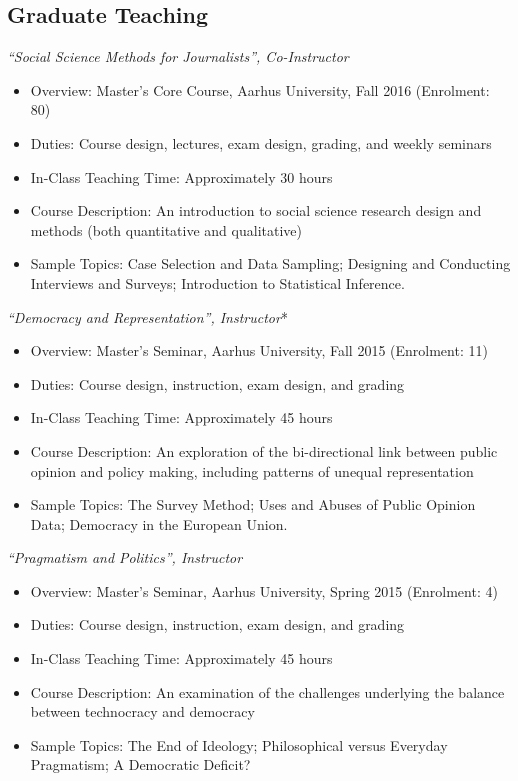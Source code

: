 \documentclass[11pt]{article}
\begin{document}
\subsection{Graduate Teaching}
\textit{“Social Science Methods for Journalists”, Co-Instructor}
	      \begin{itemize}[itemsep=0em, topsep=0em, partopsep=0em]
	      	\kern-\parskip\item Overview: Master’s Core Course, Aarhus University, Fall 2016 (Enrolment: 80)
	      	\item Duties: Course design, lectures, exam design, grading, and weekly seminars
	      	\item In-Class Teaching Time: Approximately 30 hours
	      	\item Course Description: An introduction to social science research design and methods (both quantitative and qualitative)
	      	\item Sample Topics: Case Selection and Data Sampling; Designing and Conducting Interviews and Surveys; Introduction to Statistical Inference.
	      \end{itemize}
	\textit{“Democracy and Representation”, Instructor}*
	      \begin{itemize}[itemsep=0em, topsep=0em, partopsep=0em]
	      	\kern-\parskip\item Overview: Master’s Seminar, Aarhus University, Fall 2015 (Enrolment: 11)
	      	\item Duties: Course design, instruction, exam design, and grading
	      	\item In-Class Teaching Time: Approximately 45 hours
	      	\item Course Description: An exploration of the bi-directional link between public opinion and policy making, including patterns of unequal representation
	      	\item Sample Topics: The Survey Method; Uses and Abuses of Public Opinion Data; Democracy in the European Union.
	      \end{itemize}
	\textit{“Pragmatism and Politics”, Instructor}
	      \begin{itemize}[itemsep=0em, topsep=0em, partopsep=0em]
	      	\kern-\parskip\item Overview: Master’s Seminar, Aarhus University, Spring 2015 (Enrolment: 4)
	      	\item Duties: Course design, instruction, exam design, and grading
	      	\item In-Class Teaching Time: Approximately 45 hours
	      	\item Course Description: An examination of the challenges underlying the balance between technocracy and democracy
	      	\item Sample Topics: The End of Ideology; Philosophical versus Everyday Pragmatism; A Democratic Deficit?
	      \end{itemize}
\end{document}
